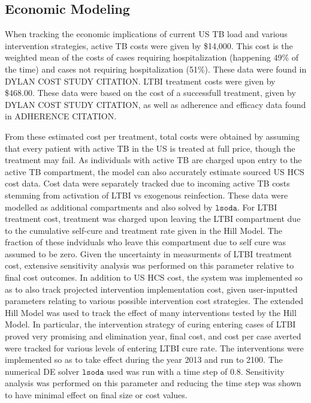 \documentclass{amsart}
\begin{document}
\subsection{Economic Modeling}
When tracking the economic implications of current US TB load and various
intervention strategies, active TB costs were given by \$14,000. This cost is
the weighted mean of the costs of cases requiring hospitalization (happening
49\% of the time) and cases not requiring hospitalization (51\%). These data
were found in DYLAN COST STUDY CITATION. LTBI treatment costs were given by
\$468.00. These data were based on the cost of a successfull treatment, given by
DYLAN COST STUDY CITATION, as well as adherence and efficacy data found in
ADHERENCE CITATION.

From these estimated cost per treatment, total costs were obtained by assuming
that every patient with active TB in the US is treated at full price, though the
treatment may fail. As individuals with active
TB are charged upon entry to the active TB compartment, the model can also
accurately estimate sourced US HCS cost data. Cost data were separately tracked
due to incoming active TB costs stemming from activation of LTBI vs exogenous
reinfection. These data were modelled as additional compartments and also solved
by $\texttt{lsoda}$. For LTBI treatment cost, treatment was
charged upon leaving the LTBI compartment due to the cumulative self-cure and
treatment rate given in the Hill Model. The fraction of these indviduals who
leave this compartment due to self cure was assumed to be zero. Given the
uncertainty in measurments of LTBI treatment cost, extensive sensitivity
analysis was performed on this parameter relative to final cost outcomes. In
addition to US HCS cost, the system was implemented so as to also track
projected intervention implementation cost, given user-inputted parameters
relating to various possible intervention cost strategies. The extended Hill
Model was used to track the effect of many interventions tested by the Hill
Model. In particular, the intervention strategy of curing entering cases of LTBI
proved very promising and elimination year, final cost, and cost per case
averted were tracked for various levels of entering LTBI cure rate. The
interventions were implemented so as to take effect during the year 2013 and run
to 2100. The numerical DE solver $\texttt{lsoda}$ used was run with a time step
of $0.8$. Sensitivity analysis was performed on this parameter and reducing the
time step was shown to have minimal effect on final size or cost values.
\end{document}
